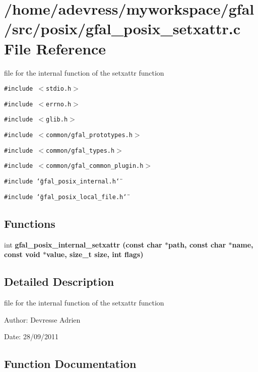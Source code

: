 \section{/home/adevress/myworkspace/gfal/src/posix/gfal\_\-posix\_\-setxattr.c File Reference}
\label{gfal__posix__setxattr_8c}
file for the internal function of the setxattr function 

{\tt \#include $<$stdio.h$>$}\par
{\tt \#include $<$errno.h$>$}\par
{\tt \#include $<$glib.h$>$}\par
{\tt \#include $<$common/gfal\_\-prototypes.h$>$}\par
{\tt \#include $<$common/gfal\_\-types.h$>$}\par
{\tt \#include $<$common/gfal\_\-common\_\-plugin.h$>$}\par
{\tt \#include \char`\"{}gfal\_\-posix\_\-internal.h\char`\"{}}\par
{\tt \#include \char`\"{}gfal\_\-posix\_\-local\_\-file.h\char`\"{}}\par
\subsection*{Functions}
\begin{CompactItemize}
\item 
int \bf{gfal\_\-posix\_\-internal\_\-setxattr} (const char $\ast$path, const char $\ast$name, const void $\ast$value, size\_\-t size, int flags)
\end{CompactItemize}


\subsection{Detailed Description}
file for the internal function of the setxattr function 

\begin{Desc}
\item[Author:]Devresse Adrien \end{Desc}
\begin{Desc}
\item[Date:]28/09/2011 \end{Desc}


\subsection{Function Documentation}
